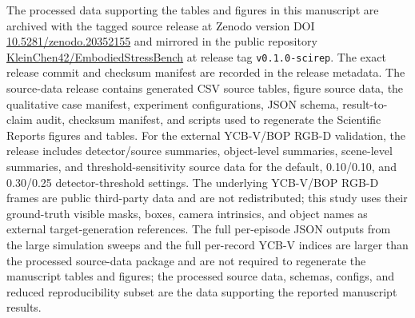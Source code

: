 The processed data supporting the tables and figures in this manuscript are archived with the tagged source release at Zenodo version DOI \href{https://doi.org/10.5281/zenodo.20352155}{10.5281/zenodo.20352155} and mirrored in the public repository \href{https://github.com/KleinChen42/EmbodiedStressBench}{KleinChen42/EmbodiedStressBench} at release tag \texttt{v0.1.0-scirep}. The exact release commit and checksum manifest are recorded in the release metadata. The source-data release contains generated CSV source tables, figure source data, the qualitative case manifest, experiment configurations, JSON schema, result-to-claim audit, checksum manifest, and scripts used to regenerate the Scientific Reports figures and tables. For the external YCB-V/BOP RGB-D validation, the release includes detector/source summaries, object-level summaries, scene-level summaries, and threshold-sensitivity source data for the default, 0.10/0.10, and 0.30/0.25 detector-threshold settings. The underlying YCB-V/BOP RGB-D frames are public third-party data and are not redistributed; this study uses their ground-truth visible masks, boxes, camera intrinsics, and object names as external target-generation references. The full per-episode JSON outputs from the large simulation sweeps and the full per-record YCB-V indices are larger than the processed source-data package and are not required to regenerate the manuscript tables and figures; the processed source data, schemas, configs, and reduced reproducibility subset are the data supporting the reported manuscript results.
